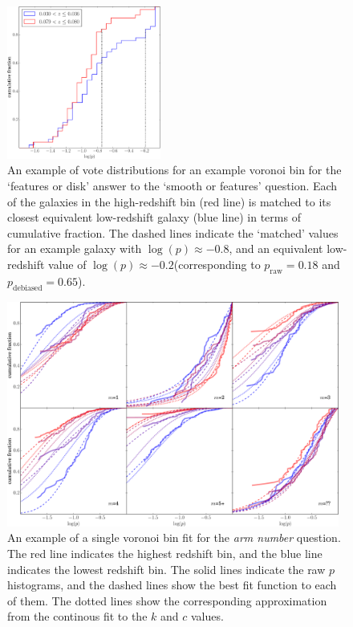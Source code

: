 \documentclass[useAMS,usenatbib]{mn2e}
\begin{document}
\begin{figure}
		\centering

        \includegraphics[width=0.45\textwidth]{Images/Bias/Debiasing/histogram_matching.pdf}

        \caption{An example of vote distributions for an example voronoi bin for the `features or disk' answer to the `smooth or features' question. Each of the galaxies in the high-redshift bin (red line) is matched to its closest equivalent low-redshift galaxy (blue line) in terms of cumulative fraction. The dashed lines indicate the `matched' values for an example galaxy with $\log(p) \approx -0.8$, and an equivalent low-redshift value of $\log(p) \approx -0.2$(corresponding to $p_{\mathrm{raw}}=0.18$ and $p_{\mathrm{debiased}}=0.65$).}

        \label{fig:histogram_matching}

\end{figure}

\begin{figure}
		\centering

        \includegraphics[width=0.975\textwidth]{Images/Bias/Debiasing/vbin_fit.pdf}

        \caption{An example of a single voronoi bin fit for the \textit{arm number} question. The red line indicates the highest redshift bin, and the blue line indicates the lowest redshift bin. The solid lines indicate the raw $p$ histograms, and the dashed lines show the best fit function to each of them. The dotted lines show the corresponding approximation from the continous fit to the $k$ and $c$ values.}

        \label{fig:function_fit}

\end{figure}
\end{document}
